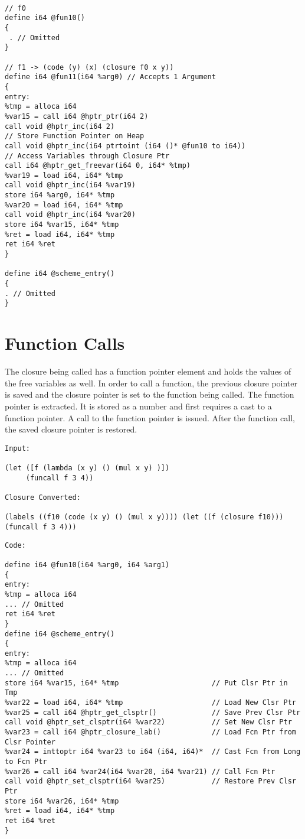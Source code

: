 \documentclass{article}
\begin{document}
\begingroup
    \fontsize{8pt}{5pt}\selectfont
\begin{verbatim}

// f0
define i64 @fun10() 
{
 . // Omitted
}
 
// f1 -> (code (y) (x) (closure f0 x y)) 
define i64 @fun11(i64 %arg0) // Accepts 1 Argument
{
entry: 
%tmp = alloca i64
%var15 = call i64 @hptr_ptr(i64 2)
call void @hptr_inc(i64 2)
// Store Function Pointer on Heap
call void @hptr_inc(i64 ptrtoint (i64 ()* @fun10 to i64))
// Access Variables through Closure Ptr
call i64 @hptr_get_freevar(i64 0, i64* %tmp) 
%var19 = load i64, i64* %tmp
call void @hptr_inc(i64 %var19)
store i64 %arg0, i64* %tmp
%var20 = load i64, i64* %tmp
call void @hptr_inc(i64 %var20)
store i64 %var15, i64* %tmp
%ret = load i64, i64* %tmp
ret i64 %ret
}

define i64 @scheme_entry()
{
. // Omitted
}
\end{verbatim}
\endgroup


\section{Function Calls}


The closure being called has a function pointer element and holds the values of the free variables as well. In order to call a function, the previous closure pointer is saved and the closure pointer is set to the function being called. The function pointer is extracted. It is stored as a number and first requires a cast to a function pointer. A call to the function pointer is issued. After the function call, the saved closure pointer is restored.

\begin{verbatim}
Input:

(let ([f (lambda (x y) () (mul x y) )])
     (funcall f 3 4))

Closure Converted:

(labels ((f10 (code (x y) () (mul x y)))) (let ((f (closure f10))) (funcall f 3 4)))

\end{verbatim}

\begin{verbatim}
Code:

define i64 @fun10(i64 %arg0, i64 %arg1)
{
entry: 
%tmp = alloca i64
... // Omitted
ret i64 %ret
}
define i64 @scheme_entry()
{
entry: 
%tmp = alloca i64
... // Omitted
store i64 %var15, i64* %tmp                      // Put Clsr Ptr in Tmp
%var22 = load i64, i64* %tmp                     // Load New Clsr Ptr
%var25 = call i64 @hptr_get_clsptr()             // Save Prev Clsr Ptr
call void @hptr_set_clsptr(i64 %var22)           // Set New Clsr Ptr
%var23 = call i64 @hptr_closure_lab()            // Load Fcn Ptr from Clsr Pointer
%var24 = inttoptr i64 %var23 to i64 (i64, i64)*  // Cast Fcn from Long to Fcn Ptr
%var26 = call i64 %var24(i64 %var20, i64 %var21) // Call Fcn Ptr
call void @hptr_set_clsptr(i64 %var25)           // Restore Prev Clsr Ptr
store i64 %var26, i64* %tmp
%ret = load i64, i64* %tmp
ret i64 %ret
}
\end{verbatim}
\end{document}

